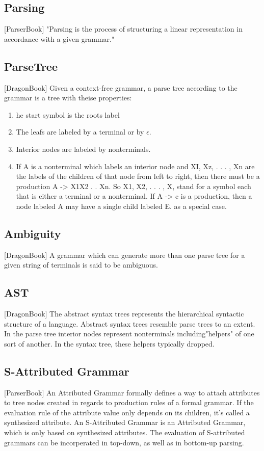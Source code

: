 \subsection{Parsing} [ParserBook]
"Parsing is the process of structuring a linear representation in accordance with a given grammar."

\subsection{ParseTree} [DragonBook]
Given a context-free grammar, a parse tree according to the grammar is a tree with theise properties:
\begin{enumerate}
	\item he start symbol is the roots label
	\item The leafs are labeled by a terminal or by $\epsilon$.
	\item Interior nodes are labeled by nonterminals.
	\item If A is a nonterminal which labels an interior node and XI, Xz, . . . , Xn are the labels of the children of that node from left to right, then there must be a production A  -> X1X2 . . Xn. So X1, X2, . . . , X, stand for a symbol each that is either a terminal or a nonterminal. If A -> c is a production, then a node labeled A may have a single child labeled E. as a special case.
\end{enumerate}
 
\subsection{Ambiguity} [DragonBook]
A grammar which can generate more than one parse tree for a given string of terminals is said to be ambiguous.

\subsection{AST}  [DragonBook]
The abstract syntax trees  represents the hierarchical syntactic structure of a language.  Abstract syntax trees resemble parse trees to an extent. In the parse tree interior nodes represent nonterminals including"helpers" of one sort of another. In the syntax tree, these helpers typically dropped. 

\subsection{S-Attributed Grammar} [ParserBook]
An Attributed Grammar formally defines a way to attach attributes to tree nodes created in regards to production rules of a formal grammar. If  the evaluation rule of the attribute value only depends on its children, it's called a synthesized attribute. An S-Attributed Grammar is an Attributed Grammar, which is only based on synthesized attributes. The evaluation of S-attributed grammars can be incorperated in top-down, as well as in bottom-up parsing.
 

